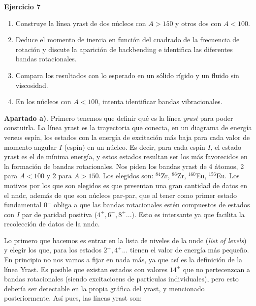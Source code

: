 \begin{texercise}
    \textbf{Ejercicio 7}
    \begin{enumerate}
        \item Construye la línea yrast de dos núcleos con $A>150$ y otros dos con $A<100$.
        \item Deduce el momento de inercia en función del cuadrado de la frecuencia de rotación y discute la aparición de backbending e identifica las diferentes bandas rotacionales.
        \item Compara los resultados con lo esperado en un sólido rígido y un fluido sin viscosidad.
        \item En los núcleos con $A<100$, intenta identificar bandas vibracionales.
    \end{enumerate}
\tcblower
    \textbf{Apartado a)}.  Primero tenemos que definir qué es la línea \textit{yrast} para poder constuirla. La línea yrast es la trayectoria que conecta, en un diagrama de energía versus espín, los estados con la energía de excitación más baja para cada valor de momento angular $I$ (espín) en un núcleo. Es decir, para cada espín $I$, el estado yrast es el de mínima energía, y estos estados resultan ser los más favorecidos en la formación de bandas rotacionales. Nos piden los bandas yrast de 4 átomos, 2 para $A<100$ y 2 para $A>150$. Los elegidos son: $^{84}$Zr, $^{86}$Zr, $^{160}$Eu, $^{156}$Eu. Los motivos por los que son elegidos es que presentan una gran cantidad de datos en el nndc, además de que son núcleos par-par, que al tener como primer estado fundamental $0^+$ obliga a que las bandas rotacionales estén compuestos de estados con $I$ par de paridad positiva ($4^+,6^+,8^+...$). Esto es intersante ya que facilita la recolección de datos de la nndc. 

    Lo primero que hacemos es entrar en la lista de niveles de la nndc (\textit{list of levels}) y elegir los que, para los estados $2^+,4^+...$ tienen el valor de energía más pequeño. En principio no nos vamos a fijar en nada más, ya que así es la definición de la línea Yrast. Es posible que existan estados con valores $14^+$ que no pertecenzcan a bandas rotacionales (siendo excitacioens de partículas individuales), pero esto debería ser detectable en la propia gráfica del yrast, y mencionado posteriormente. Así pues, las líneas yrast son: 


\end{texercise}
